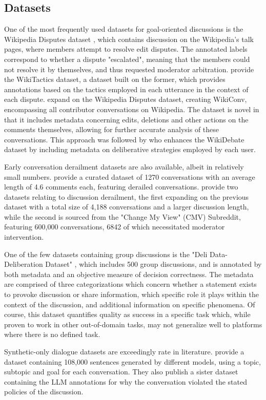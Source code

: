 \subsection{Datasets}
\label{sec:related:datasets}


One of the most frequently used datasets for goal-oriented discussions is the Wikipedia Disputes dataset \cite{de-kock-vlachos-2021-beg}, which contains discussion on the Wikipedia's talk pages, where members attempt to resolve edit disputes. The annotated labels correspond to whether a dispute "escalated", meaning that the members could not resolve it by themselves, and thus requested moderator arbitration. \cite{dekock2022disagree} provide the WikiTactics dataset, a dataset built on the former, which provides annotations based on the tactics employed in each utterance in the context of each dispute. \cite{hua2018wikiconvcorpuscompleteconversational} expand on the Wikipedia Disputes dataset, creating WikiConv, encompassing all contributor conversations on Wikipedia. The dataset is novel in that it includes metadata concerning edits, deletions and other actions on the comments themselves, allowing for further accurate analysis of these conversations. This approach was followed by \cite{al-khatib-etal-2018-modeling} who enhances the WikiDebate dataset by including metadata on deliberative strategies employed by each user.

Early conversation derailment datasets are also available, albeit in relatively small numbers. \cite{zhang-2018-gone-awry} provide a curated dataset of 1270 conversations with an average length of 4.6 comments each, featuring derailed conversations. \cite{chang-danescu-niculescu-mizil-2019-trouble} provide two datasets relating to discussion derailment, the first expanding on the previous dataset with a total size of 4,188 conversations and a larger discussion length, while the second is sourced from the "Change My View" (CMV) Subreddit, featuring 600,000 conversations, 6842 of which necessitated moderator intervention.

One of the few datasets containing group discussions is the "Deli Data-Deliberation Dataset" \cite{karadzhov2023delidata}, which includes 500 group discussions, and is annotated by both metadata and an objective measure of decision correctness. The metadata are comprised of three categorizations which concern whether a statement exists to provoke discussion or share information, which specific role it plays within the context of the discussion, and additional information on specific phenomena. Of course, this dataset quantifies quality as success in a specific task which, while proven to work in other out-of-domain tasks, may not generalize well to platforms where there is no defined task.

Synthetic-only dialogue datasets are exceedingly rate in literature. \cite{lambert2024selfdirectedsyntheticdialoguesrevisions} provide a dataset containing  108,000 sentences generated by different models, using a topic, subtopic and goal for each conversation. They also publish a sister dataset containing the LLM annotations for why the conversation violated the stated policies of the discussion.


